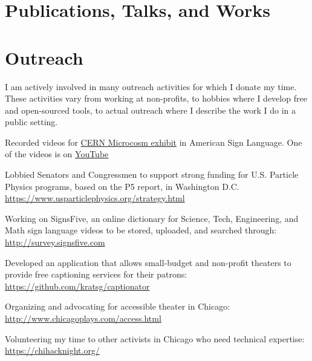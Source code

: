 \documentclass[margin,line]{resume}
\let\origsection\section%
\let\section\subsection%
\let\section\origsection%
\begin{document}
\begin{resume}
\section{\mysidestyle Publications, Talks, and Works}

\section{\mysidestyle Outreach}
I am actively involved in many outreach activities for which I donate my time. These activities vary from working at non-profits, to hobbies where I develop free and open-sourced tools, to actual outreach where I describe the work I do in a public setting.
\begin{list2}
\item Recorded videos for \href{https://microcosm.web.cern.ch/en}{CERN Microcosm exhibit} in American Sign Language. One of the videos is on \href{https://www.youtube.com/watch?v=BaGjAruqFec}{YouTube}
  \item Lobbied Senators and Congressmen to support strong funding for U.S. Particle Physics programs, based on the P5 report, in Washington D.C. \url{https://www.usparticlephysics.org/strategy.html}
  \item Working on SignsFive, an online dictionary for Science, Tech, Engineering, and Math sign language videos to be stored, uploaded, and searched through: \url{http://survey.signsfive.com}
  \item Developed an application that allows small-budget and non-profit theaters to provide free captioning services for their patrons: \url{https://github.com/kratsg/captionator}
  \item Organizing and advocating for accessible theater in Chicago: \url{http://www.chicagoplays.com/access.html}
  \item Volunteering my time to other activists in Chicago who need technical expertise: \url{https://chihacknight.org/}
\end{list2}


\end{resume}
\end{document}
